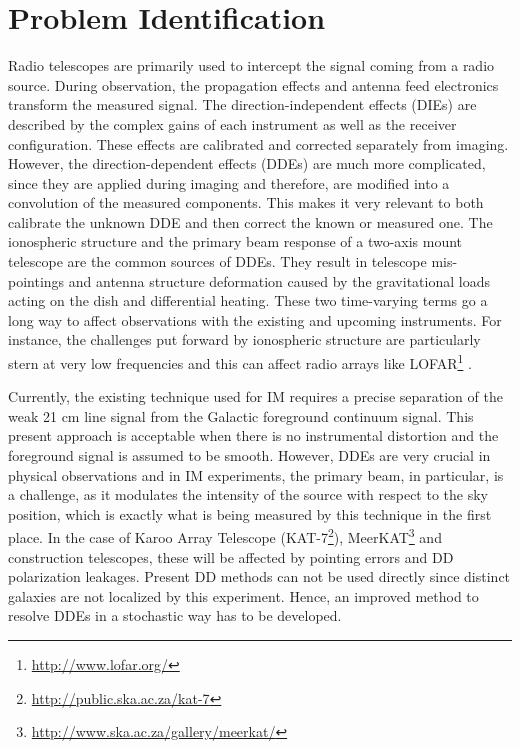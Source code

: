 \section{Problem Identification} \label{chap1:sec4}
%
%
Radio telescopes are primarily used to intercept the signal coming from a radio source. During observation, the propagation effects and antenna feed electronics 
transform the measured signal. The direction-independent effects (DIEs) are described by the complex gains of each instrument as well as the receiver configuration. 
These effects are calibrated and corrected separately from imaging. However, the direction-dependent effects (DDEs) are much more complicated, 
since they are applied during imaging and therefore, are modified into a convolution of the measured components. This makes it 
very relevant to both calibrate the unknown DDE and then correct the known or measured one.
The ionospheric structure and the primary beam response of a two-axis mount telescope are the common sources of DDEs. They result in telescope mis-pointings
and antenna structure deformation caused by the gravitational loads acting on the dish and differential heating. These two time-varying terms go a long way to affect  
observations with the existing and upcoming instruments. For instance, the challenges put forward by ionospheric structure are particularly 
stern at very low frequencies and this can affect radio arrays like LOFAR\footnote{{\url{http://www.lofar.org/}}} \citep{2010ISPM...27...30W}. 

Currently, the existing technique \citep{2015MNRAS.447..400A,2013ApJ...773...38G} used for IM requires a precise separation of the weak 21 cm line signal 
from the Galactic foreground continuum signal. This present approach is acceptable when there is  no instrumental distortion and the foreground signal is assumed
to be smooth.  However, DDEs are very crucial in physical observations and in IM experiments, the primary beam, in particular, is a challenge, 
as it modulates the intensity of the source with respect to the sky position, which is exactly what is being measured by this technique in the first place. 
In the case of Karoo Array Telescope (KAT-7\footnote{\url{http://public.ska.ac.za/kat-7}}), MeerKAT\footnote{\url{http://www.ska.ac.za/gallery/meerkat/}} and construction telescopes, these will be affected by pointing errors and DD polarization leakages. Present DD methods \citep{2011A&A...527A.106S} can not be used directly since distinct galaxies are not localized by this experiment. Hence, an improved method to resolve DDEs in a stochastic way has to be developed.
%

